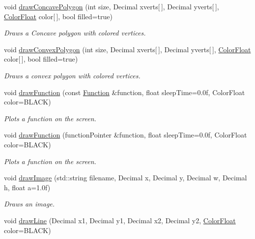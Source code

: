 \begin{DoxyCompactItemize}
void \hyperlink{classtsgl_1_1_cartesian_canvas_a7f84b79ab6fd77277c5c71fce7d0ec6a}{draw\+Concave\+Polygon} (int size, Decimal xverts\mbox{[}$\,$\mbox{]}, Decimal yverts\mbox{[}$\,$\mbox{]}, \hyperlink{structtsgl_1_1_color_float}{Color\+Float} color\mbox{[}$\,$\mbox{]}, bool filled=true)
\begin{DoxyCompactList}\small\item\em Draws a Concave polygon with colored vertices. \end{DoxyCompactList}\item 
void \hyperlink{classtsgl_1_1_cartesian_canvas_abefc7f373711cdff2477d0665b37212f}{draw\+Convex\+Polygon} (int size, Decimal xverts\mbox{[}$\,$\mbox{]}, Decimal yverts\mbox{[}$\,$\mbox{]}, \hyperlink{structtsgl_1_1_color_float}{Color\+Float} color\mbox{[}$\,$\mbox{]}, bool filled=true)
\begin{DoxyCompactList}\small\item\em Draws a convex polygon with colored vertices. \end{DoxyCompactList}\item 
void \hyperlink{classtsgl_1_1_cartesian_canvas_aa8c215b817d95e3e05ff26f835470c41}{draw\+Function} (const \hyperlink{classtsgl_1_1_function}{Function} \&function, float sleep\+Time=0.\+0f, Color\+Float color=\+B\+L\+A\+C\+K)
\begin{DoxyCompactList}\small\item\em Plots a function on the screen. \end{DoxyCompactList}\item 
void \hyperlink{classtsgl_1_1_cartesian_canvas_acf5536fbf6dca6df1fec719e13630a02}{draw\+Function} (function\+Pointer \&function, float sleep\+Time=0.\+0f, Color\+Float color=\+B\+L\+A\+C\+K)
\begin{DoxyCompactList}\small\item\em Plots a function on the screen. \end{DoxyCompactList}\item 
void \hyperlink{classtsgl_1_1_cartesian_canvas_ab2f3e7633f4f05711083eba01b0a3f4e}{draw\+Image} (std\+::string filename, Decimal x, Decimal y, Decimal w, Decimal h, float a=1.\+0f)
\begin{DoxyCompactList}\small\item\em Draws an image. \end{DoxyCompactList}\item 
void \hyperlink{classtsgl_1_1_cartesian_canvas_ace015a630f1ff280b2ecd6a864cdc5e2}{draw\+Line} (Decimal x1, Decimal y1, Decimal x2, Decimal y2, \hyperlink{structtsgl_1_1_color_float}{Color\+Float} color=B\+L\+A\+C\+K)

\end{DoxyCompactItemize}
